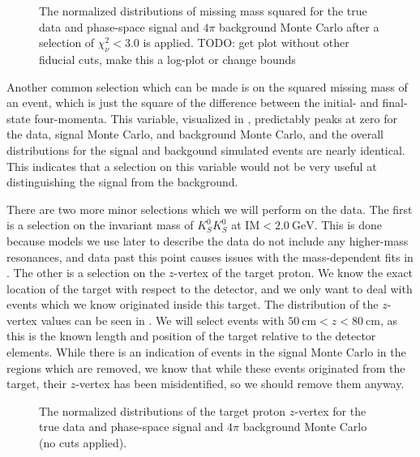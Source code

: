 \begin{figure}
  \begin{center}
    
  \end{center}
  \caption{The normalized distributions of missing mass squared for the true data and phase-space signal and $4\pi$ background Monte Carlo after a selection of $\chi^2_\nu < 3.0$ is applied. {\color{red}TODO: get plot without other fiducial cuts, make this a log-plot or change bounds}}\label{fig:mm2-combined-chisqdof-3.0}
\end{figure}

Another common selection which can be made is on the squared missing mass of an event, which is just the square of the difference between the initial- and final-state four-momenta. This variable, visualized in , predictably peaks at zero for the data, signal Monte Carlo, and background Monte Carlo, and the overall distributions for the signal and backgound simulated events are nearly identical. This indicates that a selection on this variable would not be very useful at distinguishing the signal from the background.

There are two more minor selections which we will perform on the data. The first is a selection on the invariant mass of $K_S^0K_S^0$ at $\text{IM} < \SI{2.0}{\giga\electronvolt}$. This is done because models we use later to describe the data do not include any higher-mass resonances, and data past this point causes issues with the mass-dependent fits in . The other is a selection on the $z$-vertex of the target proton. We know the exact location of the target with respect to the detector, and we only want to deal with events which we know originated inside this target. The distribution of the $z$-vertex values can be seen in . We will select events with $\SI{50}{\centi\meter} < z < \SI{80}{\centi\meter}$, as this is the known length and position of the target relative to the detector elements. While there is an indication of events in the signal Monte Carlo in the regions which are removed, we know that while these events originated from the target, their $z$-vertex has been misidentified, so we should remove them anyway.


\begin{figure}
  \begin{center}
    
  \end{center}
  \caption{The normalized distributions of the target proton $z$-vertex for the true data and phase-space signal and $4\pi$ background Monte Carlo (no cuts applied).}\label{fig:protonz-combined}
\end{figure}

